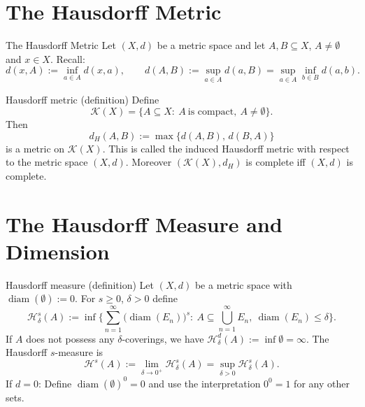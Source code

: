 \documentclass{beamer}
\DeclareMathOperator{\diam}{diam}
\begin{document}
\section{The Hausdorff Metric}
\begin{frame}{The Hausdorff Metric}
Let $(X,d)$ be a metric space and let $A, B \subseteq X$, $A \neq \emptyset$ and $x \in X$. Recall:
\[
d(x,A):=\inf_{a\in A} d(x,a),\qquad
d(A,B):=\sup_{a\in A} d(a,B)=\sup_{a\in A}\inf_{b\in B} d(a,b).
\]

\centering
{}
\end{frame}


\begin{frame}{Hausdorff metric (definition)}
Define
\[
\mathcal{K}(X)=\{A\subseteq X:\ A\ \text{is compact},\ A\neq\emptyset\}.
\]
Then
\[
d_H(A,B):=\max\{d(A,B),\,d(B,A)\}
\]
is a metric on $\mathcal{K}(X)$. This is called the induced Hausdorff metric with respect to the metric space $(X,d)$. Moreover $(\mathcal{K}(X),d_H)$ is complete iff $(X,d)$ is complete.
\end{frame}

\section{The Hausdorff Measure and Dimension}
\begin{frame}{Hausdorff measure (definition)}
Let $(X,d)$ be a metric space with $\diam(\emptyset):=0$. For $s\ge 0$, $\delta>0$ define
\[
\mathcal{H}^s_\delta(A)
:=\inf\Big\{\sum_{n=1}^\infty \big(\diam(E_n)\big)^s :\ A\subseteq\bigcup_{n=1}^\infty E_n,\ \diam(E_n)\le\delta\Big\}.
\]
If $A$ does not possess any $\delta$-coverings, we have $\mathcal{H}_\delta ^d(A) := \inf \emptyset =\infty $.
The Hausdorff $s$-measure is
\[
\mathcal{H}^s(A):=\lim_{\delta\to 0^+}\mathcal{H}^s_\delta(A)=\sup_{\delta>0}\mathcal{H}^s_\delta(A).
\]
If $ d=0$: Define $\diam (\emptyset)^0=0$ and use the interpretation $0^0=1$ for any other sets.
\end{frame}
\end{document}
